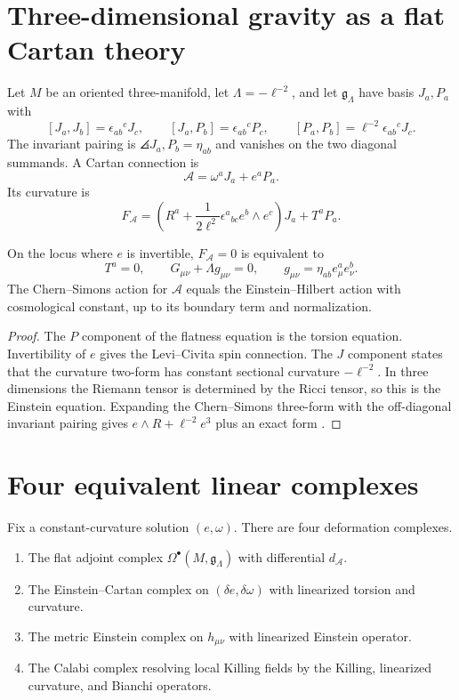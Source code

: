\chapter{Three-dimensional gravity as a flat Cartan theory}
Let $M$ be an oriented three-manifold, let $\Lambda=-\ell^{-2}$, and let $\mathfrak g_\Lambda$ have basis $J_a,P_a$ with
\[
 [J_a,J_b]=\epsilon_{ab}{}^cJ_c,
 \qquad [J_a,P_b]=\epsilon_{ab}{}^cP_c,
 \qquad [P_a,P_b]=\ell^{-2}\epsilon_{ab}{}^cJ_c.
\]
The invariant pairing is $\angles{J_a,P_b}=\eta_{ab}$ and vanishes on the two diagonal summands.  A Cartan connection is
\[
 \mathcal A=\omega^aJ_a+e^aP_a.
\]
Its curvature is
\[
 F_{\mathcal A}
 =\left(R^a+\frac1{2\ell^2}\epsilon^a{}_{bc}e^b\wedge e^c\right)J_a
 +T^aP_a.
\]

\begin{theorem}
On the locus where $e$ is invertible, $F_{\mathcal A}=0$ is equivalent to
\[
 T^a=0,
 \qquad
 G_{\mu\nu}+\Lambda g_{\mu\nu}=0,
 \qquad
 g_{\mu\nu}=\eta_{ab}e^a_\mu e^b_\nu.
\]
The Chern--Simons action for $\mathcal A$ equals the Einstein--Hilbert action with cosmological constant, up to its boundary term and normalization.
\end{theorem}
\begin{proof}
The $P$ component of the flatness equation is the torsion equation.  Invertibility of $e$ gives the Levi--Civita spin connection.  The $J$ component states that the curvature two-form has constant sectional curvature $-\ell^{-2}$.  In three dimensions the Riemann tensor is determined by the Ricci tensor, so this is the Einstein equation.  Expanding the Chern--Simons three-form with the off-diagonal invariant pairing gives $e\wedge R+\ell^{-2}e^3$ plus an exact form 
\cite{AchucarroTownsend,Witten3DGravity}.
\end{proof}

\chapter{Four equivalent linear complexes}
Fix a constant-curvature solution $(e,\omega)$.  There are four deformation complexes.
\begin{enumerate}
\item The flat adjoint complex $\Omega^\bullet(M,\mathfrak g_\Lambda)$ with differential $d_{\mathcal A}$.
\item The Einstein--Cartan complex on $(\delta e,\delta\omega)$ with linearized torsion and curvature.
\item The metric Einstein complex on $h_{\mu\nu}$ with linearized Einstein operator.
\item The Calabi complex resolving local Killing fields by the Killing, linearized curvature, and Bianchi operators.
\end{enumerate}

